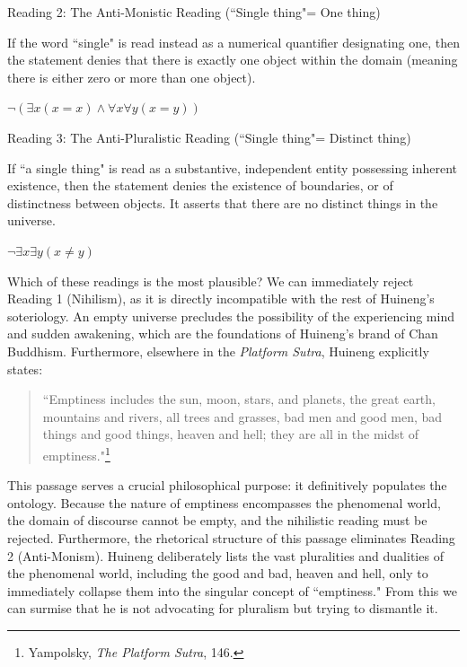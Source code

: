\vspace{1.5em}
\noindent Reading 2: The Anti-Monistic Reading (``Single thing"= One thing)

\vspace{0.5em}
\noindent If the word ``single" is read instead as a numerical quantifier
designating one, then the statement denies that there is exactly one
object within the domain (meaning there is either zero or more than one
object).

\vspace{0.5em}
\noindent $\neg(\exists x(x=x) \land \forall x \forall y(x=y))$

\vspace{1.5em}
\noindent Reading 3: The Anti-Pluralistic Reading (``Single thing"= Distinct
thing)

\vspace{0.5em}
\noindent If ``a single thing" is read as a substantive, independent entity
possessing inherent existence, then the statement denies the existence
of boundaries, or of distinctness between objects. It asserts that there
are no distinct things in the universe.

\vspace{0.5em}
\noindent $\neg \exists x \exists y(x \neq y)$

\vspace{1.5em}
\noindent Which of these readings is the most plausible? We can immediately reject
Reading 1 (Nihilism), as it is directly incompatible with the rest of
Huineng's soteriology. An empty universe precludes the possibility of
the experiencing mind and sudden awakening, which are the foundations of
Huineng's brand of Chan Buddhism. Furthermore, elsewhere in the
\emph{Platform Sutra}, Huineng explicitly states:

\begin{quote}
    ``Emptiness includes the sun, moon, stars, and planets, the great earth,
mountains and rivers, all trees and grasses, bad men and good men, bad
things and good things, heaven and hell; they are all in the midst of
emptiness."\footnote{Yampolsky, \emph{The Platform Sutra}, 146.}
\end{quote}


\noindent This passage serves a crucial philosophical purpose: it definitively
populates the ontology. Because the nature of emptiness encompasses the
phenomenal world, the domain of discourse cannot be empty, and the
nihilistic reading must be rejected. Furthermore, the rhetorical
structure of this passage eliminates Reading 2 (Anti-Monism). Huineng
deliberately lists the vast pluralities and dualities of the phenomenal
world, including the good and bad, heaven and hell, only to immediately
collapse them into the singular concept of ``emptiness." From this we can
surmise that he is not advocating for pluralism but trying to dismantle
it.


